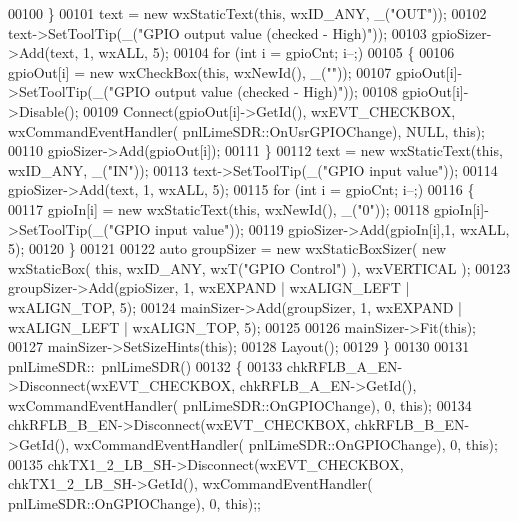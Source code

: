 \begin{DoxyCode}
{00100     \}
00101     text = \textcolor{keyword}{new} wxStaticText(\textcolor{keyword}{this}, wxID\_ANY, \_(\textcolor{stringliteral}{"OUT"}));
00102     text->SetToolTip(\_(\textcolor{stringliteral}{"GPIO output value (checked - High)"}));
00103     gpioSizer->Add(text, 1, wxALL, 5);
00104     \textcolor{keywordflow}{for} (\textcolor{keywordtype}{int} i = gpioCnt; i--;)
00105     \{
00106         gpioOut[i] = \textcolor{keyword}{new} wxCheckBox(\textcolor{keyword}{this}, wxNewId(), \_(\textcolor{stringliteral}{""}));
00107         gpioOut[i]->SetToolTip(\_(\textcolor{stringliteral}{"GPIO output value (checked - High)"}));
00108         gpioOut[i]->Disable();
00109         Connect(gpioOut[i]->GetId(), wxEVT\_CHECKBOX, wxCommandEventHandler(
      pnlLimeSDR::OnUsrGPIOChange), NULL, \textcolor{keyword}{this});
00110         gpioSizer->Add(gpioOut[i]);
00111     \}
00112     text = \textcolor{keyword}{new} wxStaticText(\textcolor{keyword}{this}, wxID\_ANY, \_(\textcolor{stringliteral}{"IN"}));
00113     text->SetToolTip(\_(\textcolor{stringliteral}{"GPIO input value"}));
00114     gpioSizer->Add(text, 1, wxALL, 5);
00115     \textcolor{keywordflow}{for} (\textcolor{keywordtype}{int} i = gpioCnt; i--;)
00116     \{
00117         gpioIn[i] = \textcolor{keyword}{new} wxStaticText(\textcolor{keyword}{this}, wxNewId(), \_(\textcolor{stringliteral}{"0"}));
00118         gpioIn[i]->SetToolTip(\_(\textcolor{stringliteral}{"GPIO input value"}));
00119         gpioSizer->Add(gpioIn[i],1, wxALL, 5);
00120     \}
00121 
00122     \textcolor{keyword}{auto} groupSizer = \textcolor{keyword}{new} wxStaticBoxSizer( \textcolor{keyword}{new} wxStaticBox( \textcolor{keyword}{this}, wxID\_ANY, wxT(\textcolor{stringliteral}{"GPIO Control"}) ), 
      wxVERTICAL );
00123     groupSizer->Add(gpioSizer, 1, wxEXPAND | wxALIGN\_LEFT | wxALIGN\_TOP, 5);
00124     mainSizer->Add(groupSizer, 1, wxEXPAND | wxALIGN\_LEFT | wxALIGN\_TOP, 5);
00125 
00126     mainSizer->Fit(\textcolor{keyword}{this});
00127     mainSizer->SetSizeHints(\textcolor{keyword}{this});
00128     Layout();
00129 \}
00130 
00131 pnlLimeSDR::~pnlLimeSDR()
00132 \{
00133     chkRFLB\_A\_EN->Disconnect(wxEVT\_CHECKBOX, chkRFLB\_A\_EN->GetId(), wxCommandEventHandler(
      pnlLimeSDR::OnGPIOChange), 0, \textcolor{keyword}{this});
00134     chkRFLB\_B\_EN->Disconnect(wxEVT\_CHECKBOX, chkRFLB\_B\_EN->GetId(), wxCommandEventHandler(
      pnlLimeSDR::OnGPIOChange), 0, \textcolor{keyword}{this});
00135     chkTX1\_2\_LB\_SH->Disconnect(wxEVT\_CHECKBOX, chkTX1\_2\_LB\_SH->GetId(), wxCommandEventHandler(
      pnlLimeSDR::OnGPIOChange), 0, \textcolor{keyword}{this});;
}
\end{DoxyCode}
